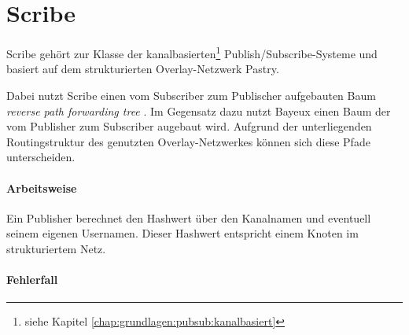 \section*{Scribe}
\label{chap:related:scribe}
Scribe \cite{Castro2002Scribe} gehört zur Klasse der kanalbasierten\footnote{siehe Kapitel \ref{chap:grundlagen:pubsub:kanalbasiert}} Publish/Subscribe-Systeme  und basiert auf dem strukturierten Overlay-Netzwerk Pastry.

Dabei nutzt Scribe einen vom Subscriber zum Publischer aufgebauten Baum \emph{reverse path forwarding tree} \cite{Dalal1978}. Im Gegensatz dazu nutzt Bayeux \cite{Zhuang2001} einen Baum der vom Publisher zum Subscriber augebaut wird. Aufgrund der unterliegenden Routingstruktur des genutzten Overlay-Netzwerkes können sich diese Pfade unterscheiden.

\cite{Rowstron2001} %

\paragraph{Arbeitsweise}
Ein Publisher berechnet den Hashwert über den Kanalnamen und eventuell seinem eigenen Usernamen. Dieser Hashwert entspricht einem Knoten im strukturiertem Netz.

\paragraph{Fehlerfall}
